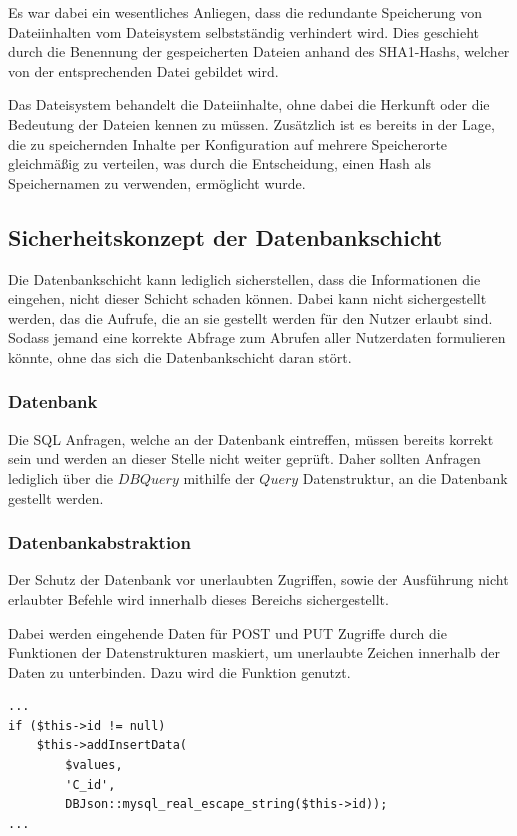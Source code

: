 \parbox{\textwidth}{Es war dabei ein wesentliches Anliegen, dass die redundante Speicherung von Dateiinhalten vom Dateisystem selbstständig verhindert wird. Dies geschieht durch die Benennung der gespeicherten Dateien anhand des SHA1-Hashs, welcher von der entsprechenden Datei gebildet wird.}

\parbox{\textwidth}{Das Dateisystem behandelt die Dateiinhalte, ohne dabei die Herkunft oder die Bedeutung der Dateien kennen zu müssen. Zusätzlich ist es bereits in der Lage, die zu speichernden Inhalte per Konfiguration auf mehrere Speicherorte gleichmäßig zu verteilen, was durch die Entscheidung, einen Hash als Speichernamen zu verwenden, ermöglicht wurde.}


\subsection{Sicherheitskonzept der Datenbankschicht}
Die Datenbankschicht kann lediglich sicherstellen, dass die Informationen die eingehen, nicht dieser Schicht schaden können. Dabei kann nicht sichergestellt werden, das die Aufrufe, die an sie gestellt werden für den Nutzer erlaubt sind. Sodass jemand eine korrekte Abfrage zum Abrufen aller Nutzerdaten formulieren könnte, ohne das sich die Datenbankschicht daran stört.

\subsubsection{Datenbank}
Die SQL Anfragen, welche an der Datenbank eintreffen, müssen bereits korrekt sein und werden an dieser Stelle nicht weiter geprüft. Daher sollten Anfragen lediglich über die $DBQuery$ mithilfe der $Query$ Datenstruktur, an die Datenbank gestellt werden.

\subsubsection{Datenbankabstraktion}
Der Schutz der Datenbank vor unerlaubten Zugriffen, sowie der Ausführung nicht erlaubter Befehle wird innerhalb dieses Bereichs sichergestellt.

Dabei werden eingehende Daten für POST und PUT Zugriffe durch die  Funktionen der Datenstrukturen maskiert, um unerlaubte Zeichen innerhalb der Daten zu unterbinden. Dazu wird die  Funktion genutzt.

\begin{minipage}{\textwidth}
\begin{lstlisting}
...
if ($this->id != null) 
    $this->addInsertData(
        $values, 
        'C_id',
        DBJson::mysql_real_escape_string($this->id));
...
\end{lstlisting}
\end{minipage}

